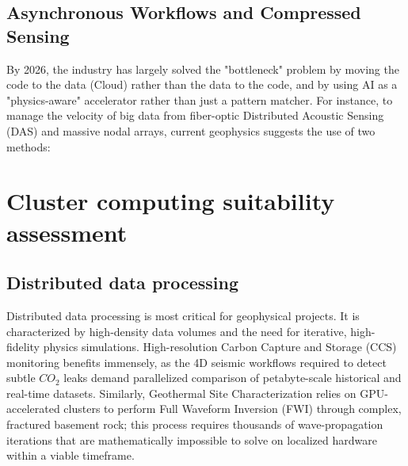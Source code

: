 \documentclass[data,article,submit,pdftex,moreauthors]{Definitions/mdpi}
\begin{document}
\subsection{Asynchronous Workflows and Compressed Sensing}

By 2026, the industry has largely solved the "bottleneck" problem by moving the code to the data (Cloud) rather than the data to the code, and by using AI as a "physics-aware" accelerator rather than just a pattern matcher. For instance, to manage the velocity of big data from fiber-optic Distributed Acoustic Sensing (DAS) and massive nodal arrays, current geophysics suggests the use of two methods:

\section{Cluster computing suitability assessment}

\subsection{Distributed data processing}

Distributed data processing is most critical for geophysical projects. It is characterized by high-density data volumes and the need for iterative, high-fidelity physics simulations. High-resolution Carbon Capture and Storage (CCS) monitoring benefits immensely, as the 4D seismic workflows required to detect subtle $CO_2$ leaks demand parallelized comparison of petabyte-scale historical and real-time datasets. Similarly, Geothermal Site Characterization relies on GPU-accelerated clusters to perform Full Waveform Inversion (FWI) through complex, fractured basement rock; this process requires thousands of wave-propagation iterations that are mathematically impossible to solve on localized hardware within a viable timeframe. 
\end{document}

